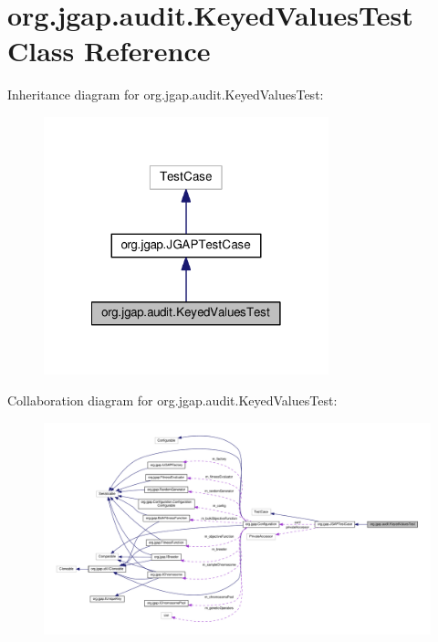 \hypertarget{classorg_1_1jgap_1_1audit_1_1_keyed_values_test}{\section{org.\-jgap.\-audit.\-Keyed\-Values\-Test Class Reference}
\label{classorg_1_1jgap_1_1audit_1_1_keyed_values_test}
}


Inheritance diagram for org.\-jgap.\-audit.\-Keyed\-Values\-Test\-:
\nopagebreak
\begin{figure}[H]
\begin{center}
\leavevmode
\includegraphics[width=234pt]{classorg_1_1jgap_1_1audit_1_1_keyed_values_test__inherit__graph}
\end{center}
\end{figure}


Collaboration diagram for org.\-jgap.\-audit.\-Keyed\-Values\-Test\-:
\nopagebreak
\begin{figure}[H]
\begin{center}
\leavevmode
\includegraphics[width=350pt]{classorg_1_1jgap_1_1audit_1_1_keyed_values_test__coll__graph}
\end{center}
\end{figure}
